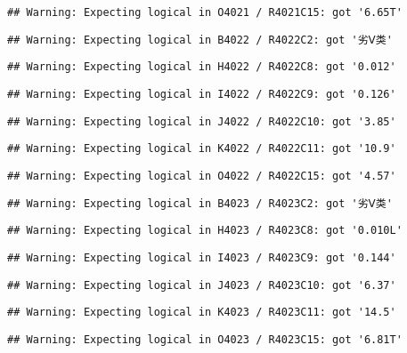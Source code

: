\documentclass[
]{article}
\begin{document}
\begin{verbatim}
## Warning: Expecting logical in O4021 / R4021C15: got '6.65T'
\end{verbatim}

\begin{verbatim}
## Warning: Expecting logical in B4022 / R4022C2: got '劣Ⅴ类'
\end{verbatim}

\begin{verbatim}
## Warning: Expecting logical in H4022 / R4022C8: got '0.012'
\end{verbatim}

\begin{verbatim}
## Warning: Expecting logical in I4022 / R4022C9: got '0.126'
\end{verbatim}

\begin{verbatim}
## Warning: Expecting logical in J4022 / R4022C10: got '3.85'
\end{verbatim}

\begin{verbatim}
## Warning: Expecting logical in K4022 / R4022C11: got '10.9'
\end{verbatim}

\begin{verbatim}
## Warning: Expecting logical in O4022 / R4022C15: got '4.57'
\end{verbatim}

\begin{verbatim}
## Warning: Expecting logical in B4023 / R4023C2: got '劣Ⅴ类'
\end{verbatim}

\begin{verbatim}
## Warning: Expecting logical in H4023 / R4023C8: got '0.010L'
\end{verbatim}

\begin{verbatim}
## Warning: Expecting logical in I4023 / R4023C9: got '0.144'
\end{verbatim}

\begin{verbatim}
## Warning: Expecting logical in J4023 / R4023C10: got '6.37'
\end{verbatim}

\begin{verbatim}
## Warning: Expecting logical in K4023 / R4023C11: got '14.5'
\end{verbatim}

\begin{verbatim}
## Warning: Expecting logical in O4023 / R4023C15: got '6.81T'
\end{verbatim}
\end{document}
